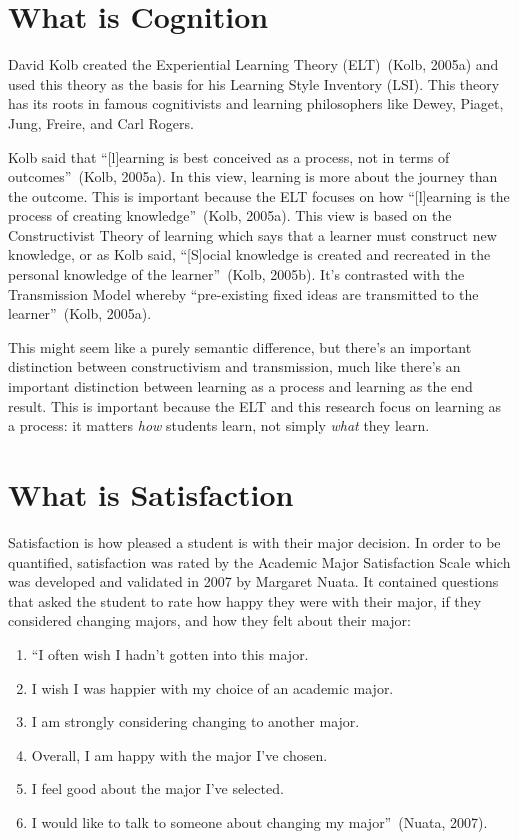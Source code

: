 \section{What is Cognition}
David Kolb created the Experiential Learning Theory (ELT)~(Kolb, 2005a) and used this theory as the basis for his Learning Style Inventory (LSI). This theory has its roots in famous cognitivists and learning philosophers like Dewey, Piaget, Jung, Freire, and Carl Rogers.

Kolb said that ``[l]earning is best conceived as a process, not in terms of outcomes''~(Kolb, 2005a). In this view, learning is more about the journey than the outcome. This is important because the ELT focuses on how ``[l]earning is the process of creating knowledge''~(Kolb, 2005a). This view is based on the Constructivist Theory of learning which says that a learner must construct new knowledge, or as Kolb said, ``[S]ocial knowledge is created and recreated in the personal knowledge of the learner''~(Kolb, 2005b). It's contrasted with the Transmission Model whereby ``pre-existing fixed ideas are transmitted to the learner''~(Kolb, 2005a).

This might seem like a purely semantic difference, but there's an important distinction between constructivism and transmission, much like there's an important distinction between learning as a process and learning as the end result. This is important because the ELT and this research focus on learning as a process: it matters \emph{how} students learn, not simply \emph{what} they learn.

\section{What is Satisfaction}
Satisfaction is how pleased a student is with their major decision. In order to be quantified, satisfaction was rated by the Academic Major Satisfaction Scale which was developed and validated in 2007 by Margaret Nuata. It contained questions that asked the student to rate how happy they were with their major, if they considered changing majors, and how they felt about their major:
\begin{enumerate}
  \item ``I often wish I hadn't gotten into this major.
  \item I wish I was happier with my choice of an academic major.
  \item I am strongly considering changing to another major.
  \item Overall, I am happy with the major I've chosen.
  \item I feel good about the major I've selected.
  \item I would like to talk to someone about changing my major''~(Nuata, 2007).
\end{enumerate}

